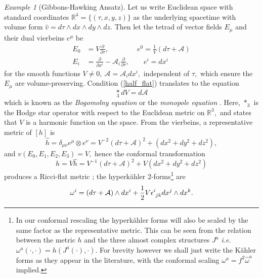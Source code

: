 \documentclass[a4paper,12pt, onecolumn, notitlepage]{article}
\theoremstyle{definition}
\theoremstyle{remark}
\newtheorem{ex}[thm]{Example}
\newcommand{\ie}{\emph{i.e.} }
\newcommand{\w}{\omega}
\newcommand{\m}{\mu}
\newcommand{\n}{\nu}
\newcommand{\e}{\epsilon}
\newcommand{\ddt}[1]{\frac{\partial #1}{\partial \tau}}
\newcommand{\dd}[2]{\frac{\partial #1}{\partial #2}}
\newcommand{\K}{K\"ahler }
\newcommand{\HK}{hyperk\"ahler }
\newcommand{\x}[1]{x^{#1}}
\newcommand{\R}{\mathbb{R}}
\begin{document}
\begin{ex}[Gibbons-Hawking Ansatz]
	Let us write Euclidean space with standard coordinates $\R^{4} = \{(\tau,x,y,z)\}$ as the underlying spacetime with volume form $\hat{v}=d\tau\wedge dx\wedge dy\wedge dz.$ Then let the tetrad of vector fields $E_{\m}$ and their dual vierbeins $e^{\m}$ be
	\begin{align*}
	\label{gh_vectors}
		E_{0} &= V\dd{}{\tau},\qquad\qquad e^{0} = \frac{1}{V}(d\tau+\mathcal{A})\\
		E_{i} &= \dd{}{\x{i}} - \mathcal{A}_{i}\ddt{},\qquad e^{i} = dx^{i}
	\end{align*}
	for the smooth functions $V\neq0,\ \mathcal{A} = \mathcal{A}_{i}dx^{i},$ independent of $\tau,$ which  ensure the $E_{\m}$ are volume-preserving. Condition (\ref{half_flat}) translates to the equation
	\begin{equation}
	\label{monopole}
		\underset{3}\ast dV = d\mathcal{A}
	\end{equation}
	which is known as the 
	\emph{Bogomolny equation} or the \emph{monopole equation} \cite{solitons}. Here, $\ast_{3}$ is the Hodge star operator with respect to the Euclidean metric on $\R^{3},$ and states that $V$ is a harmonic function on the space. From the vierbeins, a representative metric of $[h]$ is
	\begin{equation*}
		\hat{h}=\delta_{\m\n}e^{\m}\otimes e^{\n} = V^{-2}(d\tau + \mathcal{A})^{2} + (dx^{2} + dy^{2} + dz^{2}),
	\end{equation*}
	and $v(E_{0},E_{1},E_{2},E_{3})=V,$ hence the conformal transformation
	\begin{equation}
		\label{gh_metric}
		h = V\hat{h} =  V^{-1}(d\tau + \mathcal{A})^{2} + V(dx^{2} + dy^{2} + dz^{2})
	\end{equation}
	produces a Ricci-flat metric \cite{solitons}; 
	the \HK 2-forms\footnote{In our conformal rescaling the \HK forms will also be scaled by the same factor as the representative metric. This can be seen from the relation between the metric $h$ and the three almost complex structures $J^{a}$ \ie $\w^{a}(\cdot,\cdot) = h(J^{a}(\cdot),\cdot).$ For brevity however we shall just write the \K forms as they appear in the literature, with the conformal scaling $\w^{a} = f^{2}\hat{\w}^{a}$ implied.} are
	\begin{equation}
	\label{gh_forms}
		\w\indices{^i} = (d\tau + \mathcal{A})\wedge dx\indices{^i} + \frac{1}{2}V\e\indices{^i_j_k}dx\indices{^j}\wedge dx\indices{^k}.

\end{equation}
\end{ex}
\end{document}
